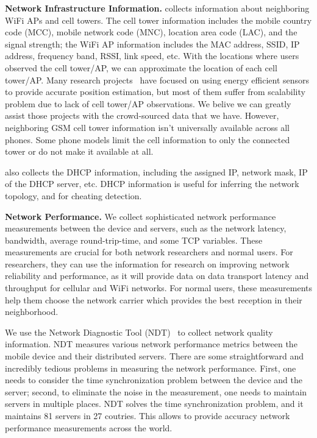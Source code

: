 {\bfseries Network Infrastructure Information.} \name{} collects information about
neighboring WiFi APs and cell towers. The cell tower information includes the mobile country code (MCC), 
mobile network code (MNC), location area code (LAC), and the signal strength; the WiFi AP information
includes the MAC address, SSID, IP address, frequency band, RSSI, link speed, etc.
With the locations where users observed the cell tower/AP, we can approximate the location of 
each cell tower/AP. Many research projects~\cite{ctrack, vtrack-sensys09} have focused on using 
energy efficient sensors to provide accurate position estimation, but most of them suffer from scalability
problem due to lack of cell tower/AP observations. We belive we can greatly assist those projects
with the crowd-sourced data that we have. However, neighboring GSM cell tower information isn't 
universally available across all phones. Some phone models limit the cell information to only 
the connected tower or do not make it available at all.

\name{} also collects the DHCP information, including the assigned IP, network mask, IP of the DHCP server, etc.
DHCP information is useful for inferring the network topology, and for cheating detection.
 
 
{\bfseries Network Performance.} We collect sophisticated network performance measurements between the device
and servers, such as the network latency, bandwidth, average round-trip-time, and some TCP variables. These
measurements are crucial for both network researchers and normal users. For researchers, they can use the 
information for research on improving network reliability and performance, as it will provide data on data 
transport latency and throughput for cellular and WiFi networks. For normal users, these measurements help them
choose the network carrier which provides the best reception in their neighborhood. 

We use the Network Diagnostic Tool (NDT)~\cite{NDT} to collect network quality information. NDT measures various network 
performance metrics between the mobile device and their distributed servers. There are some straightforward 
and incredibly tedious problems in measuring the network performance. First, one needs to consider the time 
synchronization problem between the device and the server; second, to eliminate the noise in the measurement, 
one needs to maintain servers in multiple places. 
NDT solves the time synchronization problem, and it maintains 81 servers in 27 coutries. This allows \name{}
to provide accuracy network performance measurements across the world.

